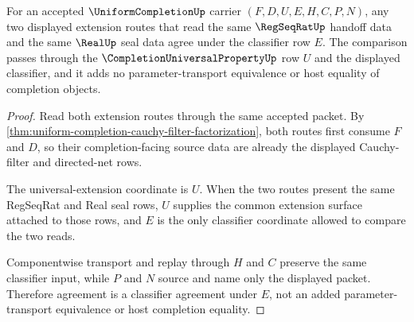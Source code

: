 \begin{theorem}
\label{thm:uniform-completion-universal-extension-uniqueness}
For an accepted $\UniformCompletionUp$ carrier $(F,D,U,E,H,C,P,N)$, any two
displayed extension routes that read the same $\RegSeqRatUp$ handoff data and
the same $\RealUp$ seal data agree under the classifier row $E$. The comparison
passes through the $\CompletionUniversalPropertyUp$ row $U$ and the displayed
classifier, and it adds no parameter-transport equivalence or host equality of
completion objects.
\end{theorem}
\begin{proof}
Read both extension routes through the same accepted packet. By
\autoref{thm:uniform-completion-cauchy-filter-factorization}, both routes
first consume $F$ and $D$, so their completion-facing source data are already
the displayed Cauchy-filter and directed-net rows.

The universal-extension coordinate is $U$. When the two routes present the
same RegSeqRat and Real seal rows, $U$ supplies the common extension surface
attached to those rows, and $E$ is the only classifier coordinate allowed to
compare the two reads.

Componentwise transport and replay through $H$ and $C$ preserve the same
classifier input, while $P$ and $N$ source and name only the displayed packet.
Therefore agreement is a classifier agreement under $E$, not an added
parameter-transport equivalence or host completion equality.
\end{proof}

